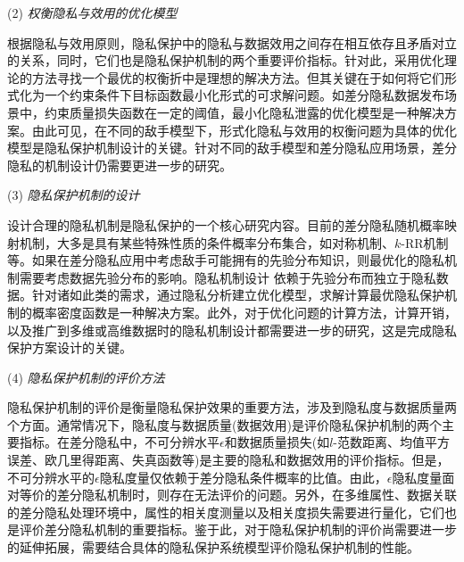 (2) {\em 权衡隐私与效用的优化模型}

根据隐私与效用原则\cite{sankar2013utility}，隐私保护中的隐私与数据效用之间存在相互依存且矛盾对立的关系，同时，它们也是隐私保护机制的两个重要评价指标。针对此，采用优化理论的方法寻找一个最优的权衡折中是理想的解决方法。但其关键在于如何将它们形式化为一个约束条件下目标函数最小化形式的可求解问题。如差分隐私数据发布场景中，约束质量损失函数在一定的阈值，最小化隐私泄露的优化模型是一种解决方案。由此可见，在不同的敌手模型下，形式化隐私与效用的权衡问题为具体的优化模型是隐私保护机制设计的关键。针对不同的敌手模型和差分隐私应用场景，差分隐私的机制设计仍需要更进一步的研究。

(3) {\em 隐私保护机制的设计}

设计合理的隐私机制是隐私保护的一个核心研究内容。目前的差分隐私随机概率映射机制，大多是具有某些特殊性质的条件概率分布集合，如对称机制\cite{kalantari2018robust}、$k$-RR\cite{kairouz2016extremal}机制等。如果在差分隐私应用中考虑敌手可能拥有的先验分布知识，则最优化的隐私机制需要考虑数据先验分布的影响。隐私机制设计
依赖于先验分布而独立于隐私数据。针对诸如此类的需求，通过隐私分析建立优化模型，求解计算最优隐私保护机制的概率密度函数是一种解决方案。此外，对于优化问题的计算方法，计算开销，以及推广到多维或高维数据时的隐私机制设计都需要进一步的研究，这是完成隐私保护方案设计的关键。


(4) {\em 隐私保护机制的评价方法}

隐私保护机制的评价是衡量隐私保护效果的重要方法，涉及到隐私度与数据质量两个方面。通常情况下，隐私度与数据质量(数据效用)是评价隐私保护机制的两个主要指标。在差分隐私中，不可分辨水平$\epsilon$和数据质量损失(如$l$-范数距离、均值平方误差、欧几里得距离、失真函数等)是主要的隐私和数据效用的评价指标。但是，不可分辨水平的$\epsilon$隐私度量仅依赖于差分隐私条件概率的比值。由此，$\epsilon$隐私度量面对等价的差分隐私机制时，则存在无法评价的问题。另外，在多维属性、数据关联的差分隐私处理环境中，属性的相关度测量以及相关度损失需要进行量化，它们也是评价差分隐私机制的重要指标。鉴于此，对于隐私保护机制的评价尚需要进一步的延伸拓展，需要结合具体的隐私保护系统模型评价隐私保护机制的性能。

